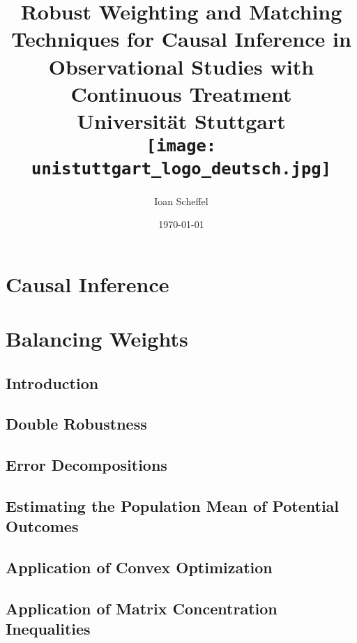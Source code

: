 \documentclass[12pt]{scrreport}
\title{
  {
    Robust Weighting and Matching Techniques for Causal Inference in Observational Studies with Continuous Treatment
  }
  \\
  {\large Universität Stuttgart}
  \\
  {\texttt{[image: unistuttgart\_logo\_deutsch.jpg]}}
}
\author{Ioan Scheffel}
\date{\today}
\theoremstyle{remark}
\theoremstyle{plain}
\begin{document}
\listoftodos

\maketitle

\tableofcontents 

%

\chapter{Causal Inference}


\chapter{Balancing Weights}
  \section{Introduction}
  
  \section{Double Robustness}
  
  \section{Error Decompositions}
  
  \section{Estimating the Population Mean of Potential Outcomes}
  
  \section{Application of Convex Optimization}
  
  \section{Application of Matrix Concentration Inequalities}
  
\end{document}
